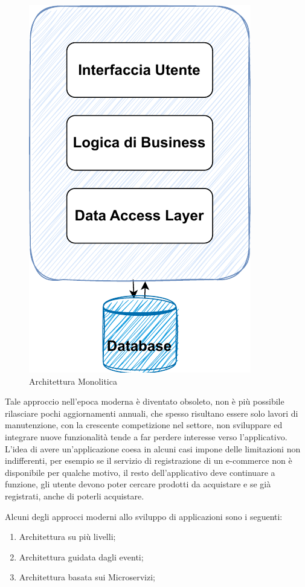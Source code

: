\begin{figure}[h]
    \centering
    \includegraphics[scale = 0.65]{capitoli/immagini/01_architettura_monolitica.pdf}
    \caption{Architettura Monolitica}
    \label{fig:architettura_monolitica}
\end{figure}

Tale approccio nell'epoca moderna è diventato obsoleto, non è più possibile rilasciare pochi aggiornamenti annuali, che spesso risultano essere solo lavori di manutenzione, con la crescente competizione nel settore, non sviluppare ed integrare nuove funzionalità tende a far perdere interesse verso l'applicativo. L'idea di avere un'applicazione coesa in alcuni casi impone delle limitazioni non indifferenti, per esempio se il servizio di registrazione di un e-commerce non è disponibile per qualche motivo, il resto dell'applicativo deve continuare a funzione, gli utente devono poter cercare prodotti da acquistare e se già registrati, anche di poterli acquistare.

Alcuni degli approcci moderni allo sviluppo di applicazioni sono i seguenti:
\begin{enumerate}
    \item Architettura su più livelli;
    \item Architettura guidata dagli eventi;
    \item Architettura basata sui Microservizi;
\end{enumerate}

